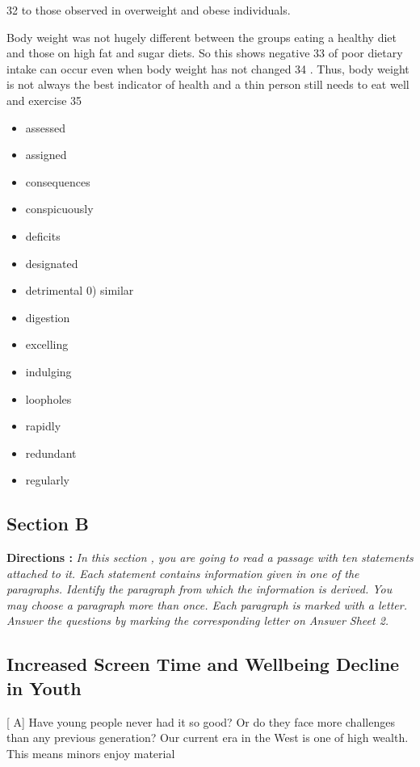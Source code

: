 \documentclass[UTF8,11pt]{ctexart}
\begin{document}
32 to those observed in overweight and obese individuals.


Body weight was not hugely different between the groups eating a healthy diet and those on high fat and sugar diets. So this shows negative 33 of poor dietary intake can occur even when body weight has not changed 34 . Thus, body weight is not always the best indicator of health and a thin person still needs to eat well and exercise 35


\begin{itemize}[leftmargin=2em,itemsep=.2em,topsep=.4em]\item[A.] assessed
\item[B.] assigned
\item[C.] consequences
\item[D.] conspicuously
\item[E.] deficits
\item[F.] designated
\item[G.] detrimental 0) similar
\item[H.] digestion
\item[I.] excelling
\item[J.] indulging
\item[K.] loopholes
\item[L.] rapidly
\item[M.] redundant
\item[N.] regularly
\end{itemize}

\subsection*{\textbf{Section B}}


\textbf{Directions : }\textit{In this section , you are going to read a passage with ten statements attached to it. Each} \textit{statement contains information given in one of the paragraphs. Identify the paragraph from} \textit{which the information is derived. You may choose a paragraph more than once. Each} \textit{paragraph is marked with a letter. Answer the questions by marking the corresponding letter} \textit{on Answer Sheet 2.}


\subsection*{\textbf{Increased Screen Time and Wellbeing Decline in Youth}}


[ A] Have young people never had it so good? Or do they face more challenges than any previous generation? Our current era in the West is one of high wealth. This means minors enjoy material
\end{document}
